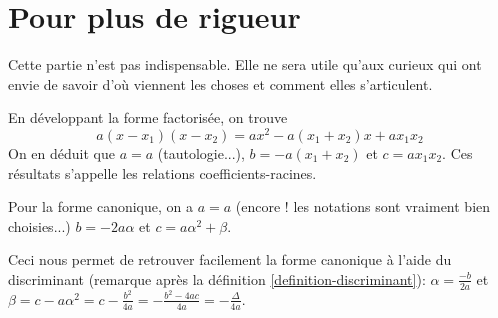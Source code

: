 \documentclass[cours]{lycee-deveaux}
\begin{document}
%
%
%
%
%
\section{Pour plus de rigueur}

Cette partie n'est pas indispensable.
Elle ne sera utile qu'aux curieux qui ont envie de savoir d'où viennent les choses et comment
elles s'articulent.

\begin{preuve}
  En développant la forme factorisée, on trouve 
  \[
  a(x-x_1)(x-x_2) = ax^2-a(x_1+x_2)x+ax_1x_2
  \]
  On en déduit que $a=a$ (tautologie...), $b=-a(x_1+x_2)$ et $c=ax_1x_2$.
  Ces résultats s'appelle les relations coefficients-racines.
  
  Pour la forme canonique, on a $a=a$ (encore ! les notations sont vraiment bien choisies...) $b=-2a\alpha$ et $c=a\alpha^2+\beta$.
\end{preuve}

Ceci nous permet de retrouver facilement la forme canonique à l'aide du discriminant
(remarque après la définition \ref{definition-discriminant}): $\alpha=\frac{-b}{2a}$ et
$\beta = c-a\alpha^2 = c-\frac{b^2}{4a} = -\frac{b^2-4ac}{4a} = -\frac{\Delta}{4a}$.
\end{document}
